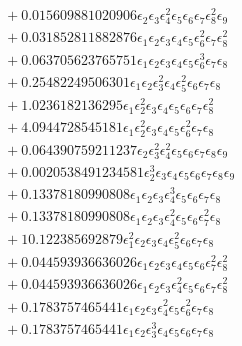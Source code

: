 \documentclass[10pt]{article}
\begin{document}
\begin{align*}
&{}  + 0.015609881020906 \epsilon_{2} \epsilon_{3} \epsilon_{4}^{2} \epsilon_{5} \epsilon_{6} \epsilon_{7} \epsilon_{8}^{2} \epsilon_{9} \\
&{}  + 0.031852811882876 \epsilon_{1} \epsilon_{2} \epsilon_{3} \epsilon_{4} \epsilon_{5} \epsilon_{6}^{2} \epsilon_{7} \epsilon_{8}^{2} \\
&{}  + 0.063705623765751 \epsilon_{1} \epsilon_{2} \epsilon_{3} \epsilon_{4} \epsilon_{5} \epsilon_{6}^{3} \epsilon_{7} \epsilon_{8} \\
&{}  + 0.25482249506301 \epsilon_{1} \epsilon_{2} \epsilon_{3}^{2} \epsilon_{4} \epsilon_{5}^{2} \epsilon_{6} \epsilon_{7} \epsilon_{8} \\
&{}  + 1.0236182136295 \epsilon_{1} \epsilon_{2}^{2} \epsilon_{3} \epsilon_{4} \epsilon_{5} \epsilon_{6} \epsilon_{7} \epsilon_{8}^{2} \\
&{}  + 4.0944728545181 \epsilon_{1} \epsilon_{2}^{2} \epsilon_{3} \epsilon_{4} \epsilon_{5} \epsilon_{6}^{2} \epsilon_{7} \epsilon_{8} \\
&{}  + 0.064390759211237 \epsilon_{2} \epsilon_{3}^{2} \epsilon_{4}^{2} \epsilon_{5} \epsilon_{6} \epsilon_{7} \epsilon_{8} \epsilon_{9} \\
&{}  + 0.0020538491234581 \epsilon_{2}^{3} \epsilon_{3} \epsilon_{4} \epsilon_{5} \epsilon_{6} \epsilon_{7} \epsilon_{8} \epsilon_{9} \\
&{}  + 0.13378180990808 \epsilon_{1} \epsilon_{2} \epsilon_{3} \epsilon_{4}^{3} \epsilon_{5} \epsilon_{6} \epsilon_{7} \epsilon_{8} \\
&{}  + 0.13378180990808 \epsilon_{1} \epsilon_{2} \epsilon_{3} \epsilon_{4}^{2} \epsilon_{5} \epsilon_{6} \epsilon_{7}^{2} \epsilon_{8} \\
&{}  + 10.122385692879 \epsilon_{1}^{2} \epsilon_{2} \epsilon_{3} \epsilon_{4} \epsilon_{5}^{2} \epsilon_{6} \epsilon_{7} \epsilon_{8} \\
&{}  + 0.044593936636026 \epsilon_{1} \epsilon_{2} \epsilon_{3} \epsilon_{4} \epsilon_{5} \epsilon_{6} \epsilon_{7}^{2} \epsilon_{8}^{2} \\
&{}  + 0.044593936636026 \epsilon_{1} \epsilon_{2} \epsilon_{3} \epsilon_{4}^{2} \epsilon_{5} \epsilon_{6} \epsilon_{7} \epsilon_{8}^{2} \\
&{}  + 0.1783757465441 \epsilon_{1} \epsilon_{2} \epsilon_{3} \epsilon_{4}^{2} \epsilon_{5} \epsilon_{6}^{2} \epsilon_{7} \epsilon_{8} \\
&{}  + 0.1783757465441 \epsilon_{1} \epsilon_{2} \epsilon_{3}^{3} \epsilon_{4} \epsilon_{5} \epsilon_{6} \epsilon_{7} \epsilon_{8} \\

\end{align*}
\end{document}
